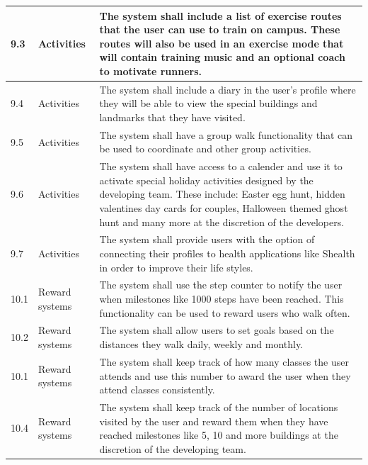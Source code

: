 \documentclass[11pt]{article}
\begin{document}
\begin{longtable}{|p{}| p{} | p{} |}
\hline

9.3& Activities & The system shall include a list of exercise routes that the user can use to train on campus. These routes will also be used in an exercise mode that will contain training music and an optional coach to motivate runners.\\

\hline

9.4& Activities & The system shall include a diary in the user's profile where they will be able to view the special buildings and landmarks that they have visited.\\

\hline

9.5& Activities & The system shall have a group walk functionality that can be used to coordinate  and other group activities.\\ 

\hline

9.6& Activities & The system shall have access to a calender and use it to activate special holiday activities designed by the developing team. These include: Easter egg hunt, hidden valentines day cards for couples, Halloween themed ghost hunt and many more at the discretion of the developers.\\

\hline

9.7& Activities & The system shall provide users with the option of connecting their profiles to health applications like Shealth in order to improve their life styles.\\

\hline

10.1& Reward systems & The system shall use the step counter to notify the user when milestones like 1000 steps have been reached. This functionality can be used to reward users who walk often.\\

\hline

10.2& Reward systems & The system shall allow users to set goals based on the distances they walk daily, weekly and monthly. \\

\hline

10.1& Reward systems & The system shall keep track of how many classes the user attends and use this number to award the user when they attend classes consistently.\\

\hline

10.4& Reward systems& The system  shall keep track of the number of locations visited by the user and reward them when they have reached milestones like 5, 10 and more buildings at the discretion of the developing team.\\


\end{longtable}
\end{document}
